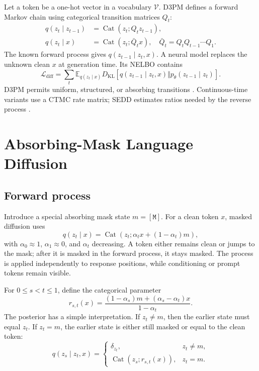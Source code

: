 \documentclass{article}
\newcommand{\mask}{\ensuremath{\mathtt{[M]}}}
\newcommand{\Vocab}{\mathcal{V}}
\begin{document}
Let a token be a one-hot vector in a vocabulary \(\Vocab\).  D3PM defines a
forward Markov chain using categorical transition matrices \(Q_t\):
\begin{align}
q(z_t\mid z_{t-1}) &= \operatorname{Cat}(z_t;Q_tz_{t-1}),\\
q(z_t\mid x) &= \operatorname{Cat}(z_t;\bar Q_tx),
\quad \bar Q_t=Q_tQ_{t-1}\cdots Q_1.
\label{eq:d3pm}
\end{align}
The known forward process gives \(q(z_{t-1}\mid z_t,x)\).  A neural model
replaces the unknown clean \(x\) at generation time.  Its NELBO contains
\begin{equation}
\mathcal{L}_{\mathrm{diff}}
=\sum_t\mathbb{E}_{q(z_t\mid x)}
 D_{\mathrm{KL}}\!\left[q(z_{t-1}\mid z_t,x)
 \Vert p_\theta(z_{t-1}\mid z_t)\right].
\label{eq:discrete-elbo}
\end{equation}
D3PM permits uniform, structured, or absorbing transitions
\citep{austin2021d3pm}.  Continuous-time variants use a CTMC rate matrix;
SEDD estimates ratios needed by the reverse process
\citep{campbell2022continuous,lou2024sedd}.

\section{Absorbing-Mask Language Diffusion}

\subsection{Forward process}

Introduce a special absorbing mask state \(m=\mask\).  For a clean token
\(x\), masked diffusion uses
\begin{equation}
q(z_t\mid x)=\operatorname{Cat}
\left(z_t;\alpha_t x+(1-\alpha_t)m\right),
\label{eq:mask-forward}
\end{equation}
with \(\alpha_0\approx1\), \(\alpha_1\approx0\), and
\(\alpha_t\) decreasing.  A token either remains clean or jumps to the mask;
after it is masked in the forward process, it stays masked.  The process is
applied independently to response positions, while conditioning or prompt
tokens remain visible.

For \(0\le s<t\le1\), define the categorical parameter
\begin{equation}
r_{s,t}(x)=
\frac{(1-\alpha_s)m+(\alpha_s-\alpha_t)x}{1-\alpha_t}.
\label{eq:mask-mixture}
\end{equation}
The posterior has a simple interpretation.  If \(z_t\neq m\), then the
earlier state must equal \(z_t\).  If \(z_t=m\), the earlier state is either
still masked or equal to the clean token:
\begin{equation}
q(z_s\mid z_t,x)=
\begin{cases}
\delta_{z_t}, & z_t\neq m,\\[2pt]
\operatorname{Cat}(z_s;r_{s,t}(x)), & z_t=m.
\end{cases}
\label{eq:mask-posterior}
\end{equation}
\end{document}
